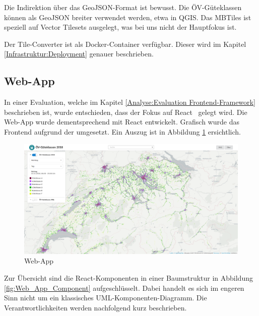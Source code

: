 Die Indirektion über das \gls{GeoJSON}-Format ist bewusst.
Die ÖV-Güteklassen können als \gls{GeoJSON} breiter verwendet werden, etwa in \gls{QGIS}.
Das MBTiles ist speziell auf Vector Tilesets ausgelegt, was bei uns nicht der Hauptfokus ist.

Der Tile-Converter ist als Docker-Container verfügbar.
Dieser wird im Kapitel \ref{Infrastruktur:Deployment} genauer beschrieben.

\subsection{Web-App}
\label{Implementation:Web-App}

In einer Evaluation, welche im Kapitel \ref{Analyse:Evaluation Frontend-Framework} beschrieben ist, wurde entschieden, dass der Fokus auf React~\cite{react} gelegt wird.
Die Web-App wurde dementsprechend mit React entwickelt.
Grafisch wurde das Frontend aufgrund der  umgesetzt.
Ein Auszug ist in Abbildung \ref{fig:Web_App} ersichtlich.

\begin{figure}[ht]
    \centering
    \includegraphics[width=1.0\linewidth]{projectdoc/img/screenshot-webapp.png}
    \caption[Web-App]{Web-App}
    \label{fig:Web_App}
\end{figure}

Zur Übersicht sind die React-Komponenten in einer Baumstruktur in Abbildung \ref{fig:Web_App_Component} aufgeschlüsselt.
Dabei handelt es sich im engeren Sinn nicht um ein klassisches \acs{UML}-Komponenten-Diagramm.
Die Verantwortlichkeiten werden nachfolgend kurz beschrieben.

